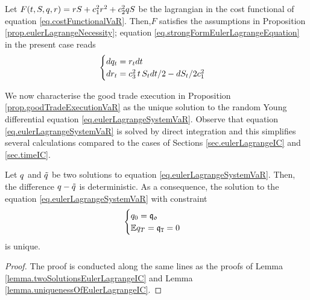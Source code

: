 \documentclass[10pt,a4paper]{article}
\begin{document}
Let $F(t,S,q,r)= r S + c_{1}^{2} r^{2} + c_{2}^{2} q S$ be the lagrangian in the cost functional of equation \eqref{eq.costFunctionalVaR}. Then,$F$  satisfies the assumptions in Proposition \ref{prop.eulerLagrangeNecessity}; equation \eqref{eq.strongFormEulerLagrangeEquation} in the present case reads
\begin{equation}\label{eq.eulerLagrangeSystemVaR}
\begin{cases}
dq_t=r_{t} dt \\
dr_{t} = c_{3}^{2} \, t \, S_t dt/2 - dS_t / 2c_{1}^{2}
\end{cases}
\end{equation}

We now characterise the good trade execution in Proposition \ref{prop.goodTradeExecutionVaR} as the unique solution to the random Young differential equation \eqref{eq.eulerLagrangeSystemVaR}. Observe that equation \eqref{eq.eulerLagrangeSystemVaR} is solved by direct integration and this simplifies several calculations compared to the cases of Sections \ref{sec.eulerLagrangeIC} and \ref{sec.timeIC}. 

\begin{lemma}\label{lemma.uniquenessOfSolutionEulerLagrangeVaR}
Let $q$ and $\tilde{q}$ be two solutions to equation \eqref{eq.eulerLagrangeSystemVaR}. Then, the difference $q - \tilde{q}$ is deterministic. As a consequence, the solution to the equation \eqref{eq.eulerLagrangeSystemVaR} with constraint
\begin{equation}\label{eq.initialAndTerminalCOnditionsVaR}
\begin{cases}
q_0 = \mathfrak{q_0} \\
\mathbb{{E}} q_T = \mathfrak{q}_{\mathtt{T} } = 0 
\end{cases}
\end{equation}
is unique.
\end{lemma}
\begin{proof}
The proof is conducted along the same lines as the proofs of Lemma \ref{lemma.twoSolutionsEulerLagrangeIC} and Lemma \ref{lemma.uniquenessOfEulerLagrangeIC}. 
\end{proof}
\end{document}
